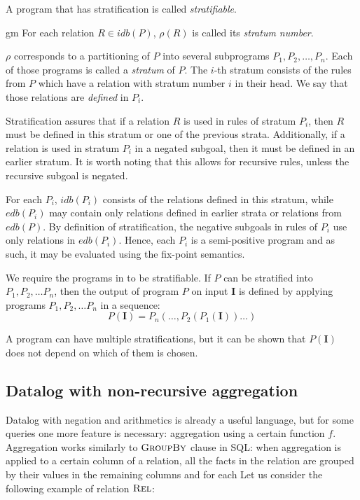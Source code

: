 \begin{defn}
A program that has stratification is called \emph{stratifiable}.
\end{defn}
gm
For each relation $R \in idb(P )$, $\rho(R)$ is called its \emph{stratum number}.

$\rho$ corresponds to a partitioning of $P$ into several subprograms $P_1, P_2, \dots, P_n$. Each of those programs is called a \emph{stratum} of $P$. The $i$-th stratum consists of the rules from $P$ which have a relation with stratum number $i$ in their head. We say that those relations are \emph{defined} in $P_i$.

Stratification assures that if a relation $R$ is used in rules of stratum $P_i$, then $R$ must be defined in this stratum or one of the previous strata. Additionally, if a relation is used in stratum $P_i$ in a negated subgoal, then it must be defined in an earlier stratum. It is worth noting that this allows for recursive rules, unless the recursive subgoal is negated.

For each $P_i$, $idb(P_i)$ consists of the relations defined in this stratum, while $edb(P_i)$ may contain only relations defined in earlier strata or relations from $edb(P)$. By definition of stratification, the negative subgoals in rules of $P_i$ use only relations in $edb(P_i)$. Hence, each $P_i$ is a semi-positive program and as such, it may be evaluated using the fix-point semantics.

We require the programs in \datalogneg to be stratifiable. If $P$ can be stratified into $P_1, P_2, \dots P_n$, then the output of program $P$ on input $\textbf{I}$ is defined by applying programs $P_1, P_2, \dots P_n$ in a sequence:
$$P(\textbf{I}) = P_n(\dots, P_2(P_1(\textbf{I}))\dots)$$

A program can have multiple stratifications, but it can be shown that $P(\textbf{I})$ does not depend on which of them is chosen.


\subsection{Datalog with non-recursive aggregation}\label{ss:datalognra}

Datalog with negation and arithmetics is already a useful language, but for some queries one more feature is necessary: aggregation using a certain function $f$. Aggregation works similarly to $\textsc{GroupBy}$ clause in SQL: when aggregation is applied to a certain column of a relation, all the facts in the relation are grouped by their values in the remaining columns and for each 
Let us consider the following example of relation $\textsc{Rel}$:

